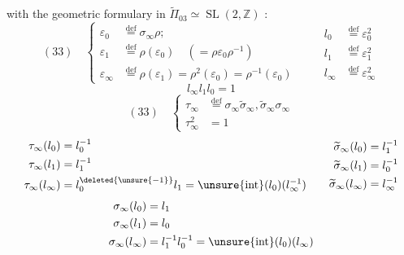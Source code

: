 with the geometric formulary in $\widetilde\Pi_{03}\simeq\operatorname{SL}(2,\mathbb Z)$ :
\[
(33)\quad\left\{\begin{aligned}
\varepsilon_0&\overset{\mathrm{def}}=\sigma_\infty\rho;\\
\varepsilon_1&\overset{\mathrm{def}}=\rho(\varepsilon_0)\quad(=\rho\varepsilon_0\rho^{-1})\\
\varepsilon_\infty&\overset{\mathrm{def}}=\rho(\varepsilon_1)=\rho^2(\varepsilon_0)=\rho^{-1}(\varepsilon_0)
\end{aligned}\right.
\qquad
\begin{aligned}
l_0&\overset{\mathrm{def}}=\varepsilon_0^2\\
l_1&\overset{\mathrm{def}}=\varepsilon_1^2\\
l_\infty&\overset{\mathrm{def}}=\varepsilon_\infty^2
\end{aligned}
\]
\[
l_\infty l_1l_0=1
\]
\[
(33)\quad\left\{\begin{aligned}
\tau_\infty&\overset{\mathrm{def}}=\sigma_\infty\widetilde\sigma_\infty,\widetilde\sigma_\infty\sigma_\infty\\
\tau_\infty^2&=1
\end{aligned}\right.
\]
\[
\begin{aligned}
\tau_\infty(l_0)&=l_0^{-1}\\
\tau_\infty(l_1)&=l_1^{-1}\\
\tau_\infty(l_\infty)&=l_0^{\deleted{\unsure{-1}}}l_1=\unsure{\operatorname{int}}(l_0)(l_\infty^{-1})
\end{aligned}
\qquad
\begin{aligned}
\widetilde\sigma_\infty(l_0)&=l_1^{-1}\\
\widetilde\sigma_\infty(l_1)&=l_0^{-1}\\
\widetilde\sigma_\infty(l_\infty)&=l_\infty^{-1}
\end{aligned}
\]
\[
\begin{aligned}
\sigma_\infty(l_0)&=l_1\\
\sigma_\infty(l_1)&=l_0\\
\sigma_\infty(l_\infty)&=l_1^{-1}l_0^{-1}=\unsure{\operatorname{int}}(l_0)(l_\infty)
\end{aligned}
\]
